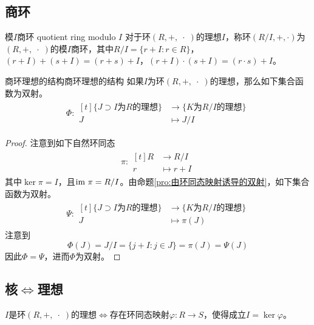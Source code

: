 \subsection{商环}

\begin{definition}{模$I$商环 quotient ring modulo $I$}
	对于环$(R,+,\;\cdot\;)$的理想$I$，称环$(R/I,+,\cdot)$为$(R,+,\;\cdot\;)$的模$I$商环，其中$R/I=\{ r+I:r\in R \}$，$(r+I)+(s+I)=(r+s)+I$，$(r+I)\cdot (s+I)=(r\cdot s)+I$。
\end{definition}

\begin{proposition}{商环理想的结构}{商环理想的结构}
	如果$I$为环$(R,+,\;\cdot\;)$的理想，那么如下集合函数为双射。
	\begin{align*}
		\Phi:\begin{aligned}[t]
			\{ J\supset I\text{为}R\text{的理想} \}&\longrightarrow \{ K\text{为}R/I\text{的理想} \}\\
			J&\longmapsto J/I
		\end{aligned}
	\end{align*}
\end{proposition}

\begin{proof}
	注意到如下自然环同态
	\begin{align*}
		\pi:\begin{aligned}[t]
			R&\longrightarrow R/I\\
			r&\longmapsto r+I
		\end{aligned}
	\end{align*}
	其中$\ker\pi=I$，且$\text{im } \pi=R/I$。由命题\ref{pro:由环同态映射诱导的双射}，如下集合函数为双射。
	\begin{align*}
		\Psi:\begin{aligned}[t]
			\{ J\supset I\text{为}R\text{的理想} \}&\longrightarrow \{ K\text{为}R/I\text{的理想} \}\\
			J&\longmapsto \pi(J)
		\end{aligned}
	\end{align*}
	注意到
	$$
	\Phi(J)=J/I=\{ j+I:j\in J \}=\pi(J)=\Psi(J)
	$$
	因此$\Phi=\Psi$，进而$\Phi$为双射。
\end{proof}

\subsection{核$\iff$理想}

\begin{theorem}
	$I$是环$(R,+,\;\cdot\;)$的理想$\iff $存在环同态映射$\varphi:R\to S$，使得成立$I=\ker\varphi$。
\end{theorem}

